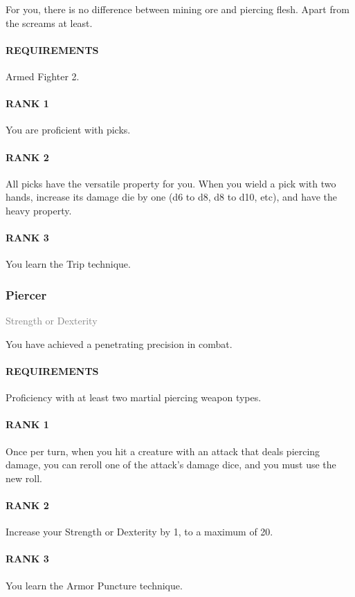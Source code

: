 \normalsize
For you, there is no difference between mining ore and piercing flesh.
Apart from the screams at least.
\paragraph{REQUIREMENTS} Armed Fighter 2.
\paragraph{RANK 1} You are proficient with picks.
\paragraph{RANK 2} All picks have the versatile property for you.
When you wield a pick with two hands, increase its damage die by one (d6 to d8, d8 to d10, etc), and have the heavy property.
\paragraph{RANK 3} You learn the Trip technique.

\subsubsection{Piercer} \label{feat::piercer}
\small{\textcolor{gray}{Strength or Dexterity}}

\normalsize
You have achieved a penetrating precision in combat.
\paragraph{REQUIREMENTS} Proficiency with at least two martial piercing weapon types.
\paragraph{RANK 1} Once per turn, when you hit a creature with an attack that deals piercing damage, you can reroll one of the attack's damage dice, and you must use the new roll.
\paragraph{RANK 2} Increase your Strength or Dexterity by 1, to a maximum of 20.
\paragraph{RANK 3} You learn the Armor Puncture technique.

